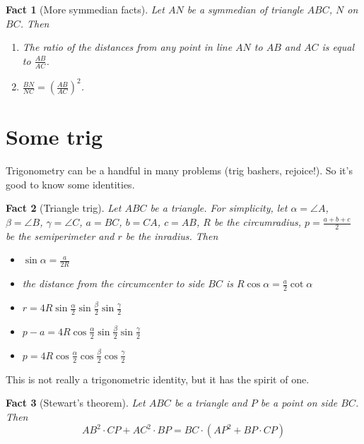 \documentclass[10pt]{article}
\newtheorem{fact}{Fact}%
\theoremstyle{definition}
\theoremstyle{remark}
\begin{document}
\begin{fact}[More symmedian facts]
Let $AN$ be a symmedian of triangle $ABC$, $N$ on $BC$. Then
\begin{enumerate}
\item The ratio of the distances from any point in line $AN$ to $AB$ and $AC$ is equal to $\frac{AB}{AC}$.
\item $\frac{BN}{NC} = \left(\frac{AB}{AC}\right)^2$.
\end{enumerate}
\end{fact}


\section{Some trig}
Trigonometry can be a handful in many problems (trig bashers, rejoice!). So it's good to know some identities.
\begin{fact}[Triangle trig]
Let $ABC$ be a triangle. For simplicity, let $\alpha = \angle A$, $\beta = \angle B$, $\gamma = \angle C$, $a = BC$, $b = CA$, $c = AB$, $R$ be the circumradius, $p = \frac{a+b+c}2$ be the semiperimeter and $r$ be the inradius. Then
\begin{itemize}
\item $\sin\alpha = \frac a{2R}$
\item the distance from the circumcenter to side $BC$ is $R\cos\alpha = \frac a2\cot\alpha$
\item $r = 4R\sin\frac\alpha2\sin\frac\beta2\sin\frac\gamma2$
\item $p-a = 4R\cos\frac\alpha2\sin\frac\beta2\sin\frac\gamma2$
\item $p = 4R\cos\frac\alpha2\cos\frac\beta2\cos\frac\gamma2$
\end{itemize}
\end{fact}


This is not really a trigonometric identity, but it has the spirit of one.
\begin{fact}[Stewart's theorem]
Let $ABC$ be a triangle and $P$ be a point on side $BC$. Then
$$AB^2\cdot CP + AC^2\cdot BP = BC\cdot (AP^2 + BP\cdot CP)$$
\end{fact}
\end{document}
